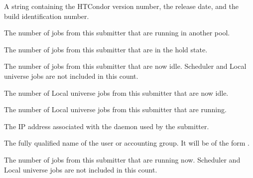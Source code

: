 
\begin{description}

\item[\AdAttr{CondorVersion}:] A string containing the HTCondor version
number, the release date, and the build identification number.

\item[\AdAttr{FlockedJobs}:] The number of jobs from this submitter 
that are running in another pool.

\item[\AdAttr{HeldJobs}:] The number of jobs from this submitter 
that are in the hold state.

\item[\AdAttr{IdleJobs}:] The number of jobs from this submitter 
that are now idle. Scheduler and Local universe jobs are not included in this count.

\item[\AdAttr{LocalJobsIdle}:] The number of Local universe jobs from this submitter 
that are now idle.

\item[\AdAttr{LocalJobsRunning}:] The number of Local universe jobs from this submitter 
that are running.

\item[\AdAttr{MyAddress}:] The IP address associated with the
 daemon used by the submitter.

\item[\AdAttr{Name}:] The fully qualified name of the user or accounting group.
It will be of the form .

\item[\AdAttr{RunningJobs}:] The number of jobs from this submitter 
that are running now. Scheduler and Local universe jobs are not included in this count.


\end{description}
